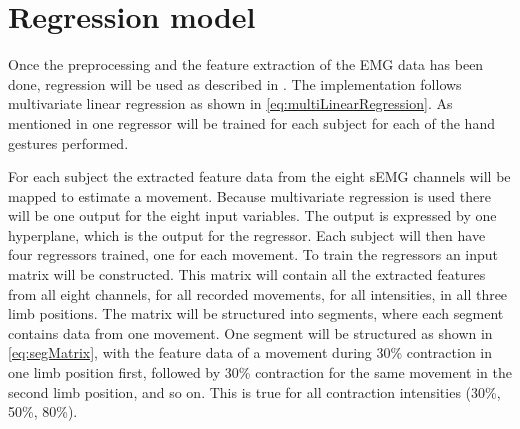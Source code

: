 \section{Regression model}


Once the preprocessing and the feature extraction of the EMG data has been done, regression will be used as described in . The implementation follows multivariate linear regression as shown in \eqref{eq:multiLinearRegression}. As mentioned in  one regressor will be trained for each subject for each of the hand gestures performed. 

For each subject the extracted feature data from the eight sEMG channels will be mapped to estimate a movement. Because multivariate regression is used there will be one output for the eight input variables. The output is expressed by one hyperplane, which is the output for the regressor. Each subject will then have four regressors trained, one for each movement. 
To train the regressors an input matrix will be constructed. This matrix will contain all the extracted features from all eight channels, for all recorded movements, for all intensities, in all three limb positions. The matrix will be structured into segments, where each segment contains data from one movement. One segment will be structured as shown in \ref{eq:segMatrix}, with the feature data of a movement during 30\% contraction in one limb position first, followed by 30\% contraction for the same movement in the second limb position, and so on. This is true for all contraction intensities (30\%, 50\%, 80\%).

